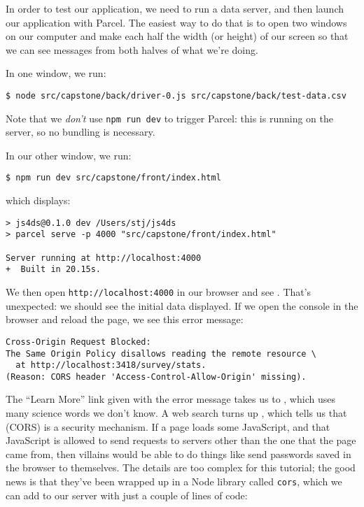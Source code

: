 In order to test our application,
we need to run a data server,
and then launch our application with Parcel.
The easiest way to do that is to open two windows on our computer
and make each half the width (or height) of our screen
so that we can see messages from both halves of what we're doing.

In one window,
we run:

\begin{verbatim}
$ node src/capstone/back/driver-0.js src/capstone/back/test-data.csv
\end{verbatim}

\noindent
Note that we \emph{don't} use \texttt{npm\ run\ dev} to trigger Parcel:
this is running on the server,
so no bundling is necessary.

In our other window,
we run:

\begin{verbatim}
$ npm run dev src/capstone/front/index.html
\end{verbatim}

\noindent
which displays:

\begin{verbatim}
> js4ds@0.1.0 dev /Users/stj/js4ds
> parcel serve -p 4000 "src/capstone/front/index.html"

Server running at http://localhost:4000
+  Built in 20.15s.
\end{verbatim}


We then open \texttt{http://localhost:4000} in our browser and see .
That's unexpected: we should see the initial data displayed.
If we open the console in the browser and reload the page,
we see this error message:

\begin{verbatim}
Cross-Origin Request Blocked:
The Same Origin Policy disallows reading the remote resource \
  at http://localhost:3418/survey/stats.
(Reason: CORS header 'Access-Control-Allow-Origin' missing).
\end{verbatim}

\noindent
The ``Learn More'' link given with the error message takes us to
,
which uses many science words we don't know.
A web search turns up ,
which tells us that \gref{g:cors}{cross-origin resource sharing} (CORS)\index{CORS}
is a security mechanism.
If a page loads some JavaScript,
and that JavaScript is allowed to send requests to servers other than the one that the page came from,
then villains would be able to do things like send passwords saved in the browser to themselves.
The details are too complex for this tutorial;
the good news is that they've been wrapped up in a Node library called \texttt{cors},
which we can add to our server with just a couple of lines of code:

